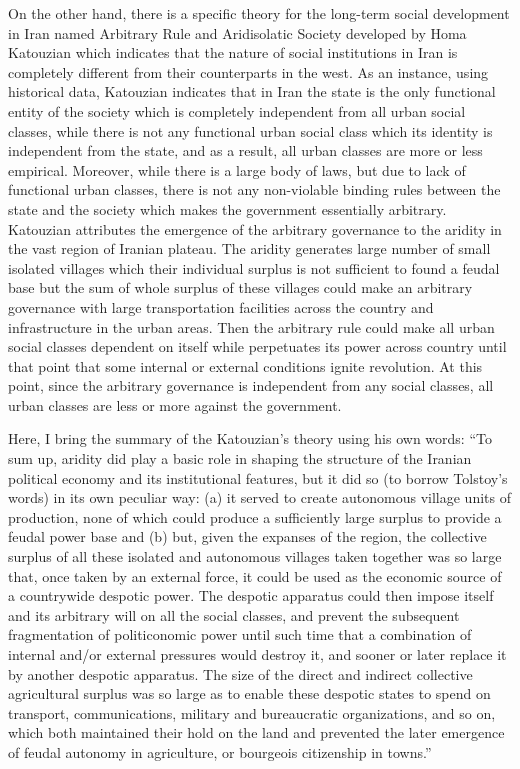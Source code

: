 \documentclass{article}
\begin{document}
On the other hand, there is a specific theory for the long-term social development in Iran named Arbitrary Rule and Aridisolatic Society developed by Homa Katouzian \citep{Katouzian2003} which indicates that the nature of social institutions in Iran is completely different from their counterparts in the west. As an instance, using historical data, Katouzian indicates that in Iran the state is the only functional entity of the society which is completely independent from all urban social classes, while there is not any functional urban social class which its identity is independent from the state, and as a result, all urban classes are more or less empirical. Moreover, while there is a large body of laws, but due to lack of functional urban classes, there is not any non-violable binding rules between the state and the society which makes the government essentially arbitrary. Katouzian attributes the emergence of the arbitrary governance to the aridity in the vast region of Iranian plateau. The aridity generates large number of small isolated villages which their individual surplus is not sufficient to found a feudal base but the sum of whole surplus of these villages could make an arbitrary governance with large transportation facilities across the country and infrastructure in the urban areas. Then the arbitrary rule could make all urban social classes dependent on itself while perpetuates its power across country until that point that some internal or external conditions ignite revolution. At this point, since the arbitrary governance is independent from any social classes, all urban classes are less or more against the government.

Here, I bring the summary of the Katouzian’s theory using his own words: “To sum up, aridity did play a basic role in shaping the structure of the Iranian political economy and its institutional features, but it did so (to borrow Tolstoy’s words) in its own peculiar way: (a) it served to create autonomous village units of production, none of which could produce a sufficiently large surplus to provide a feudal power base and (b) but, given the expanses of the region, the collective surplus of all these isolated and autonomous villages taken together was so large that, once taken by an external force, it could be used as the economic source of a countrywide despotic power. The despotic apparatus could then impose itself and its arbitrary will on all the social classes, and prevent the subsequent fragmentation of politiconomic power until such time that a combination of internal and/or external pressures would destroy it, and \textendash sooner or later \textendash replace it by another despotic apparatus. The size of the direct and indirect collective agricultural surplus was so large as to enable these despotic states to spend on transport, communications, military and bureaucratic organizations, and so on, which both maintained their hold on the land and prevented the later emergence of feudal autonomy in agriculture, or bourgeois citizenship in towns.” \citep{Katouzian2003}
\end{document}
